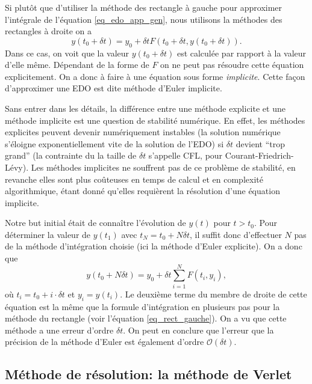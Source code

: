 \documentclass[a4paper,12pt]{book}
\renewcommand{\eqref}[1]{\ref{#1}}
\begin{document}
Si plutôt que d'utiliser la méthode des rectangle à gauche pour approximer l'intégrale de l'équation \eqref{eq_edo_app_gen}, nous utilisons
la méthodes des rectangles à droite on a
\begin{equation}
 y(t_0+\delta t)=y_0+\delta t F(t_0+\delta t,y(t_0+\delta t)).
\end{equation}
Dans ce cas, on voit que la valeur $y(t_0+\delta t)$ est calculée par rapport à la valeur d'elle même. Dépendant 
de la forme de $F$ on ne peut pas résoudre cette équation explicitement. On a donc à faire à une 
équation sous forme \textit{implicite}. Cette façon d'approximer une EDO 
est dite méthode d'Euler implicite.

Sans entrer dans les détails, la différence entre une méthode explicite et une méthode implicite 
est une question de stabilité numérique. En effet, les méthodes explicites
peuvent devenir numériquement instables (la solution numérique s'éloigne exponentiellement vite de la solution
de l'EDO) si $\delta t$ devient ``trop grand'' (la contrainte du la taille de $\delta t$ s'appelle CFL, pour Courant-Friedrich-Lévy). 
Les méthodes implicites ne souffrent pas de ce problème de stabilité, en revanche elles sont plus coûteuses en temps de calcul
et en complexité algorithmique, étant donné qu'elles requièrent la résolution d'une équation implicite.

Notre but initial était de connaître l'évolution de $y(t)$ pour $t>t_0$. Pour déterminer 
la valeur de $y(t_1)$ avec $t_N=t_0+N\delta t$, il suffit donc d'effectuer $N$ pas 
de la méthode d'intégration choisie (ici la méthode d'Euler explicite). On a donc que
\begin{equation}
 y(t_0+N\delta t)=y_0+\delta t\sum_{i=1}^{N}F(t_i,y_i),
\end{equation}
où $t_i=t_0+i\cdot\delta t$ et $y_i=y(t_i)$. Le deuxième terme du membre de droite de cette équation est la même que la formule d'intégration 
en plusieurs pas pour la méthode du rectangle (voir l'équation \eqref{eq_rect_gauche}). On a vu que cette méthode a une erreur d'ordre $\delta t$.
On peut en conclure que l'erreur que la précision de la méthode d'Euler est également d'ordre $\mathcal{O}(\delta t)$.

\subsection{Méthode de résolution: la méthode de Verlet}
\end{document}

